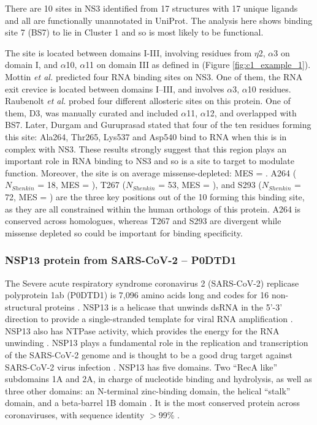 There are 10 sites in NS3 identified from 17 structures with 17 unique ligands and all are functionally unannotated in UniProt. The analysis here shows binding site 7 (BS7) to lie in Cluster 1 and so is most likely to be functional.

The site is located between domains I-III, involving residues from $\eta$2, $\alpha$3 on domain I, and $\alpha$10, $\alpha$11 on domain III as defined in \cite{TIAN_2016_ZIKV} (Figure \ref{fig:c1_example_1}). Mottin \textit{et al.} \cite{MOTTIN_2017_ZIKA_HELICASE} predicted four RNA binding sites on NS3. One of them, the RNA exit crevice is located between domains I–III, and involves $\alpha$3, $\alpha$10 residues. Raubenolt \textit{et al.} \cite{RAUBENOLT_2021_ZIKA_ALLOSTERIC} probed four different allosteric sites on this protein. One of them, D3, was manually curated and included $\alpha$11, $\alpha$12, and overlapped with BS7. Later, Durgam and Guruprasad \cite{DURGAM_2022_ZIKA_ATP} stated that four of the ten residues forming this site: Ala264, Thr265, Lys537 and Asp540 bind to RNA when this is in complex with NS3. These results strongly suggest that this region plays an important role in RNA binding to NS3 and so is a site to target to modulate function. Moreover, the site is on average missense-depleted: MES =  . A264 ($N_{Shenkin}$ = 18, MES = ), T267 ($N_{Shenkin}$ = 53, MES = ), and S293 ($N_{Shenkin}$ = 72, MES =  ) are the three key positions out of the 10 forming this binding site, as they are all constrained within the human orthologs of this protein. A264 is conserved across homologues, whereas T267 and S293 are divergent while missense depleted so could be important for binding specificity.

\subsubsection{NSP13 protein from SARS-CoV-2 -- P0DTD1}

The Severe acute respiratory syndrome coronavirus 2 (SARS-CoV-2) replicase polyprotein 1ab (P0DTD1) is 7,096 amino acids long and codes for 16 non-structural proteins \cite{NAQVI_2020_SARSCOV2}. NSP13 is a helicase that unwinds dsRNA in the 5’-3’ direction to provide a single-stranded template for viral RNA amplification \cite{YUE_2022_SARSCOV2}. NSP13 also has NTPase activity, which provides the energy for the RNA unwinding \cite{SHU_2020_SARSCOV2}. NSP13 plays a fundamental role in the replication and transcription of the SARS-CoV-2 genome and is thought to be a good drug target against SARS-CoV-2 virus infection \cite{ZENG_2021_SARSCOV2}. NSP13 has five domains. Two ``RecA like'' subdomains 1A and 2A, in charge of nucleotide binding and hydrolysis, as well as three other domains: an N-terminal zinc-binding domain, the helical ``stalk'' domain, and a beta-barrel 1B domain \cite{ROMEO_2022_SARSCOV2}. It is the most conserved protein across coronaviruses, with sequence identity $>$99\% \cite{RICCI_2022_SARSCOV2}.

